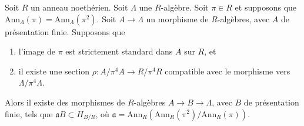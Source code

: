\begin{lemma}
\label{lemma-desingularize}
Soit $R$ un anneau noethérien.
Soit $\Lambda$ une $R$-algèbre. Soit $\pi \in R$ et
supposons que $\text{Ann}_\Lambda(\pi) = \text{Ann}_\Lambda(\pi^2)$. Soit
$A \to \Lambda$ un morphisme de $R$-algèbres, avec $A$ de
présentation finie. Supposons que
\begin{enumerate}
\item l'image de $\pi$ est strictement standard dans $A$ sur $R$, et
\item il existe une section $\rho : A/\pi^4 A \to R/\pi^4 R$
compatible avec le morphisme vers $\Lambda/\pi^4 \Lambda$.
\end{enumerate}
Alors il existe des morphismes de $R$-algèbres $A \to B \to \Lambda$, avec
$B$ de présentation finie, tels que $\mathfrak a B \subset H_{B/R}$, où
$\mathfrak a = \text{Ann}_R(\text{Ann}_R(\pi^2)/\text{Ann}_R(\pi))$.
\end{lemma}


